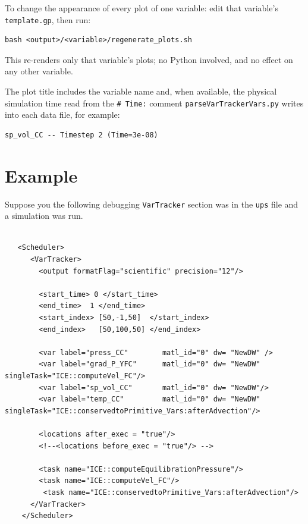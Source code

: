 \noindent To change the appearance of every plot of one variable: edit that
variable's \verb|template.gp|, then run:
\begin{Verbatim}[fontsize=\footnotesize]
  bash <output>/<variable>/regenerate_plots.sh
\end{Verbatim}
This re-renders only that variable's plots; no Python involved, and no
effect on any other variable.

\noindent The plot title includes the variable name and, when available, the
physical simulation time read from the \verb|# Time:| comment
\verb|parseVarTrackerVars.py| writes into each data file, for example:
\begin{Verbatim}[fontsize=\footnotesize]
  sp_vol_CC -- Timestep 2 (Time=3e-08)
\end{Verbatim}


\section{Example}

\noindent Suppose you the following debugging \verb|VarTracker| section was in the \verb|ups| file and a simulation was run.

\begin{Verbatim}[fontsize=\scriptsize]

   <Scheduler>
      <VarTracker>
        <output formatFlag="scientific" precision="12"/>
        
        <start_time> 0 </start_time>
        <end_time>  1 </end_time>
        <start_index> [50,-1,50]  </start_index>
        <end_index>   [50,100,50] </end_index>
  
        <var label="press_CC"        matl_id="0" dw= "NewDW" />
        <var label="grad_P_YFC"      matl_id="0" dw= "NewDW" singleTask="ICE::computeVel_FC"/>
        <var label="sp_vol_CC"       matl_id="0" dw= "NewDW"/>
        <var label="temp_CC"         matl_id="0" dw= "NewDW" singleTask="ICE::conservedtoPrimitive_Vars:afterAdvection"/>
        
        <locations after_exec = "true"/>
        <!--<locations before_exec = "true"/> -->
        
        <task name="ICE::computeEquilibrationPressure"/>
        <task name="ICE::computeVel_FC"/>
         <task name="ICE::conservedtoPrimitive_Vars:afterAdvection"/>
      </VarTracker>
    </Scheduler>   
\end{Verbatim}

